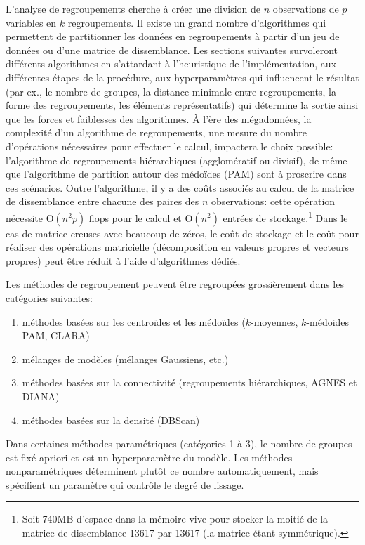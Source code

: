 \documentclass[
  11pt,
  letterpaper,
]{book}
\providecommand{\tightlist}{%
  \setlength{\itemsep}{0pt}\setlength{\parskip}{0pt}}\usepackage{longtable,booktabs,array}
\theoremstyle{definition}
\theoremstyle{remark}
\begin{document}
L'analyse de regroupements cherche à créer une division de \(n\)
observations de \(p\) variables en \(k\) regroupements. Il existe un
grand nombre d'algorithmes qui permettent de partitionner les données en
regroupements à partir d'un jeu de données ou d'une matrice de
dissemblance. Les sections suivantes survoleront différents algorithmes
en s'attardant à l'heuristique de l'implémentation, aux différentes
étapes de la procédure, aux hyperparamètres qui influencent le résultat
(par ex., le nombre de groupes, la distance minimale entre
regroupements, la forme des regroupements, les éléments représentatifs)
qui détermine la sortie ainsi que les forces et faiblesses des
algorithmes. À l'ère des mégadonnées, la complexité d'un algorithme de
regroupements, une mesure du nombre d'opérations nécessaires pour
effectuer le calcul, impactera le choix possible: l'algorithme de
regroupements hiérarchiques (agglomératif ou divisif), de même que
l'algorithme de partition autour des médoïdes (PAM) sont à proscrire
dans ces scénarios. Outre l'algorithme, il y a des coûts associés au
calcul de la matrice de dissemblance entre chacune des paires des \(n\)
observations: cette opération nécessite \(\mathrm{O}(n^2p)\) flops pour
le calcul et \(\mathrm{O}(n^2)\) entrées de stockage.\footnote{Soit
  740MB d'espace dans la mémoire vive pour stocker la moitié de la
  matrice de dissemblance 13617 par 13617 (la matrice étant
  symmétrique).} Dans le cas de matrice creuses avec beaucoup de zéros,
le coût de stockage et le coût pour réaliser des opérations matricielle
(décomposition en valeurs propres et vecteurs propres) peut être réduit
à l'aide d'algorithmes dédiés.

Les méthodes de regroupement peuvent être regroupées grossièrement dans
les catégories suivantes:

\begin{enumerate}
\def\labelenumi{\arabic{enumi}.}
\tightlist
\item
  méthodes basées sur les centroïdes et les médoïdes (\(k\)-moyennes,
  \(k\)-médoides PAM, CLARA)
\item
  mélanges de modèles (mélanges Gaussiens, etc.)
\item
  méthodes basées sur la connectivité (regroupements hiérarchiques,
  AGNES et DIANA)
\item
  méthodes basées sur la densité (DBScan)
\end{enumerate}

Dans certaines méthodes paramétriques (catégories 1 à 3), le nombre de
groupes est fixé apriori et est un hyperparamètre du modèle. Les
méthodes nonparamétriques déterminent plutôt ce nombre automatiquement,
mais spécifient un paramètre qui contrôle le degré de lissage.
\end{document}
